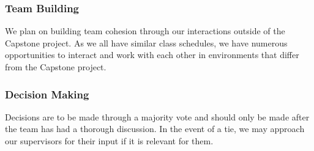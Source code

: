 \documentclass{article}
\begin{document}
\subsubsection*{Team Building}

We plan on building team cohesion through our interactions outside of the Capstone
project. As we all have similar class schedules, we have numerous opportunities to
interact and work with each other in environments that differ from the Capstone
project. 

\subsubsection*{Decision Making} 

Decisions are to be made through a majority vote and should only be made after the
team has had a thorough discussion. In the event of a tie, we may approach our
supervisors for their input if it is relevant for them.
\end{document}
